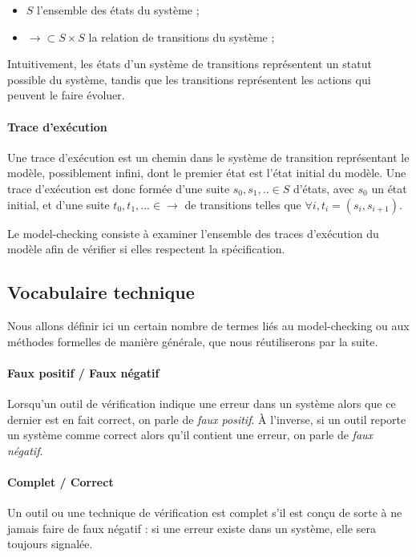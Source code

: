 \begin{itemize}
\item
  \(S\) l'ensemble des états du système ;
\item
  \(\rightarrow \subset S \times S\) la relation de transitions du
  système ;
\end{itemize}

Intuitivement, les états d'un système de transitions représentent un
statut possible du système, tandis que les transitions représentent les
actions qui peuvent le faire évoluer.

\paragraph{Trace d'exécution}
Une trace d'exécution est un chemin dans le système de transition
représentant le modèle, possiblement infini, dont le premier état est
l'état initial du modèle. Une trace d'exécution est donc formée d'une
suite \(s_0, s_1, .. \in S\) d'états, avec \(s_0\) un état initial, et
d'une suite \(t_0, t_1, ... \in \rightarrow\) de transitions telles que
\(\forall i, t_i = (s_i, s_{i+1})\).

Le model-checking consiste à examiner l'ensemble des traces
d'exécution du modèle afin de vérifier si elles respectent la spécification.

\subsection{Vocabulaire technique}

Nous allons définir ici un certain nombre de termes liés au model-checking ou
aux méthodes formelles de manière générale, que nous réutiliserons par la suite.

\paragraph{Faux positif / Faux négatif}

Lorsqu'un outil de vérification indique une erreur dans un système alors que ce
dernier est en fait correct, on parle de \emph{faux positif}. À l'inverse, si un
outil reporte un système comme correct alors qu'il contient une erreur, on parle
de \emph{faux négatif}.

\paragraph{Complet / Correct}

Un outil ou une technique de vérification est complet s’il est conçu de sorte à
ne jamais faire de faux négatif : si une erreur existe dans un système, elle
sera toujours signalée.

